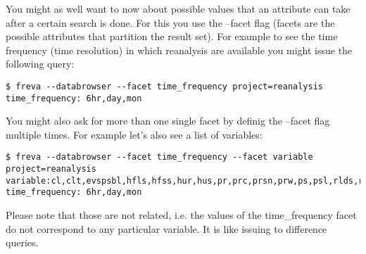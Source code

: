 \documentclass[a4paper,11pt]{ltxdoc}
\begin{document}
You might as well want to now about possible values that an attribute can take after a certain search is done. For this you use the --facet flag (facets are the possible attributes that partition the result set). For example to see the time frequency (time resolution) in which reanalysis are available you might issue the following query:
\begin{lstlisting}
$ freva --databrowser --facet time_frequency project=reanalysis time_frequency: 6hr,day,mon
\end{lstlisting}
You might also ask for more than one single facet by definig the --facet flag multiple times. For example let's also see a list of variables:
\begin{lstlisting}
$ freva --databrowser --facet time_frequency --facet variable project=reanalysis 
variable:cl,clt,evspsbl,hfls,hfss,hur,hus,pr,prc,prsn,prw,ps,psl,rlds,rldscs,rlus,rlut,rlutcs,rsds,rsdscs,rsdt,rsut,rsutcs,sfcwind,ta,tas,tauu,tauv,tro3,ts,ua,uas,va,vas,wap,zg time_frequency: 6hr,day,mon
\end{lstlisting}
Please note that those are not related, i.e. the values of the time\_frequency facet do not correspond to any particular variable. It is like issuing to difference queries.
\end{document}
